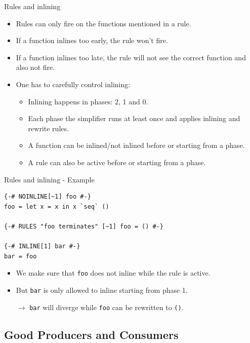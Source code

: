 \documentclass[11pt]{beamer}
\begin{document}
\begin{frame}[fragile]{Rules and inlining}
	\begin{itemize}
		\item Rules can only fire on the functions mentioned in a rule.
		\item If a function inlines too early, the rule won't fire.
		\item If a function inlines too late, the rule will not see the correct function and also not fire.
		\item One has to carefully control inlining:
		\begin{itemize}
			\item Inlining happens in phases: 2, 1 and 0.
			\item Each phase the simplifier runs at least once and applies inlining and rewrite rules.
			\item A function can be inlined/not inlined before or starting from a phase.
			\item A rule can also be active before or starting from a phase.
		\end{itemize}
	\end{itemize}
\end{frame}

\begin{frame}[fragile]{Rules and inlining - Example}
\begin{verbatim}
{-# NOINLINE[~1] foo #-}
foo = let x = x in x `seq` ()

{-# RULES "foo terminates" [~1] foo = () #-}

{-# INLINE[1] bar #-}
bar = foo

\end{verbatim}
\begin{itemize}
	\item We make sure that \texttt{foo} does not inline while the rule is active.
	\item But \texttt{bar} is only allowed to inline starting from phase 1.
	\item[$\rightarrow$] \texttt{bar} will diverge while \texttt{foo} can be rewritten to \texttt{()}.
\end{itemize}
\end{frame}

\subsection{Good Producers and Consumers}
\end{document}
